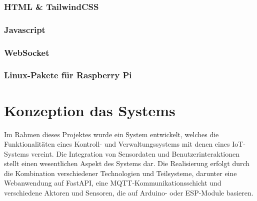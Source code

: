 \documentclass[12pt, letterpaper]{article}
\begin{document}
    \subsubsection{HTML \& TailwindCSS}
    \subsubsection{Javascript}
    \subsubsection{WebSocket}
    \subsubsection{Linux-Pakete für Raspberry Pi}

\newpage
\section{Konzeption das Systems}
\par Im Rahmen dieses Projektes wurde ein System entwickelt, welches die Funktionalitäten eines Kontroll- und Verwaltungssystems mit denen eines IoT-Systems vereint. Die Integration von Sensordaten und Benutzerinteraktionen stellt einen wesentlichen Aspekt des Systems dar. Die Realisierung erfolgt durch die Kombination verschiedener Technologien und Teilsysteme, darunter eine Webanwendung auf FastAPI, eine MQTT-Kommunikationsschicht und verschiedene Aktoren und Sensoren, die auf Arduino- oder ESP-Module basieren.
\end{document}
